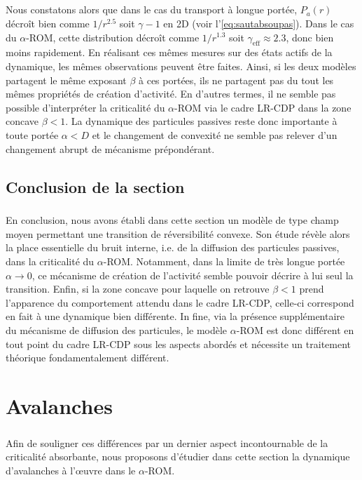 \subparagraph{}Nous constatons alors que dans le cas du transport à longue portée, $P_a(r)$ décroît bien comme $1/r^{2.5}$ soit $\gamma - 1$ en 2D (voir l'\autoref{eq:sautabsoupas}). Dans le cas du $\alpha$-ROM, cette distribution décroît comme $1/r^{1.3}$ soit $\gamma_\text{eff}\approx 2.3$, donc bien moins rapidement. En réalisant ces mêmes mesures sur des états actifs de la dynamique, les mêmes observations peuvent être faites. Ainsi, si les deux modèles partagent le même exposant $\beta$ à ces portées, ils ne partagent pas du tout les mêmes propriétés de création d'activité. En d'autres termes, il ne semble pas possible d'interpréter la criticalité du $\alpha$-ROM via le cadre LR-CDP  dans la zone concave $\beta < 1$. La dynamique des particules passives reste donc importante à toute portée $\alpha < D$ et le changement de convexité ne semble pas relever d'un changement abrupt de mécanisme prépondérant.

\subsection{Conclusion de la section}

\subparagraph{}En conclusion, nous avons établi dans cette section un modèle de type champ moyen permettant une transition de réversibilité convexe. Son étude révèle alors la place essentielle du bruit interne, i.e. de la diffusion des particules passives, dans la criticalité du $\alpha$-ROM. Notamment, dans la limite de très longue portée $\alpha\rightarrow 0$, ce mécanisme de création de l'activité semble pouvoir décrire à lui seul la transition. Enfin, si la zone concave pour laquelle on retrouve $\beta<1$ prend l'apparence du comportement attendu dans le cadre LR-CDP, celle-ci correspond en fait à une dynamique bien différente. In fine, via la présence supplémentaire du mécanisme de diffusion des particules, le modèle $\alpha$-ROM est donc différent en tout point du cadre LR-CDP sous les aspects abordés et nécessite un traitement théorique fondamentalement différent.

\section{Avalanches}

\subparagraph{}Afin de souligner ces différences par un dernier aspect incontournable de la criticalité absorbante, nous proposons d'étudier dans cette section la dynamique d'avalanches à l’œuvre dans le $\alpha$-ROM.

